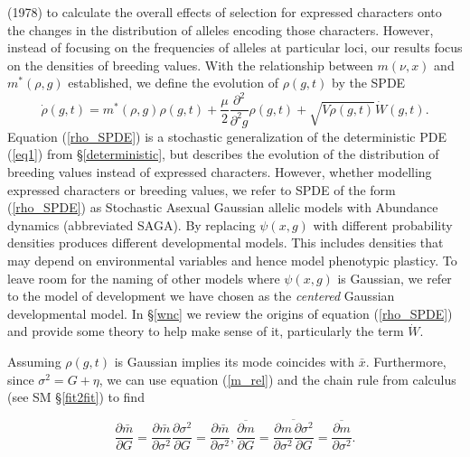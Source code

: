 \documentclass[]{article}
\begin{document}
(1978) to calculate the overall effects of selection for expressed
characters onto the changes in the distribution of alleles encoding
those characters. However, instead of focusing on the frequencies of
alleles at particular loci, our results focus on the densities of
breeding values. With the relationship between \(m(\nu,x)\) and
\(m^*(\rho,g)\) established, we define the evolution of \(\rho(g,t)\) by
the SPDE \begin{equation}\label{rho_SPDE}
\dot\rho(g,t)=m^*(\rho,g)\rho(g,t)+\frac{\mu}{2}\frac{\partial^2}{\partial^2 g}\rho(g,t)+\sqrt{V\rho(g,t)}\dot W(g,t).
\end{equation} Equation (\ref{rho_SPDE}) is a stochastic generalization
of the deterministic PDE (\ref{eq1}) from \S\ref{deterministic}, but
describes the evolution of the distribution of breeding values instead
of expressed characters. However, whether modelling expressed characters
or breeding values, we refer to SPDE of the form (\ref{rho_SPDE}) as
Stochastic Asexual Gaussian allelic models with Abundance dynamics
(abbreviated SAGA). By replacing \(\psi(x,g)\) with different
probability densities produces different developmental models. This
includes densities that may depend on environmental variables and hence
model phenotypic plasticy. To leave room for the naming of other models
where \(\psi(x,g)\) is Gaussian, we refer to the model of development we
have chosen as the \emph{centered} Gaussian developmental model. In
\S\ref{wnc} we review the origins of equation (\ref{rho_SPDE}) and
provide some theory to help make sense of it, particularly the term
\(\dot W\).

Assuming \(\rho(g,t)\) is Gaussian implies its mode coincides with
\(\bar x\). Furthermore, since \(\sigma^2=G+\eta\), we can use equation
(\ref{m_rel}) and the chain rule from calculus (see SM \S\ref{fit2fit})
to find

\begin{subequations}
\begin{equation}
\frac{\partial\bar m}{\partial G}=\frac{\partial\bar m}{\partial\sigma^2}\frac{\partial\sigma^2}{\partial G}=\frac{\partial\bar m}{\partial\sigma^2},
\end{equation}
\begin{equation}
\overline{\frac{\partial m}{\partial G}}=\overline{\frac{\partial m}{\partial\sigma^2}\frac{\partial\sigma^2}{\partial G}}=\overline{\frac{\partial m}{\partial\sigma^2}}.
\end{equation}
\end{subequations}
\end{document}
